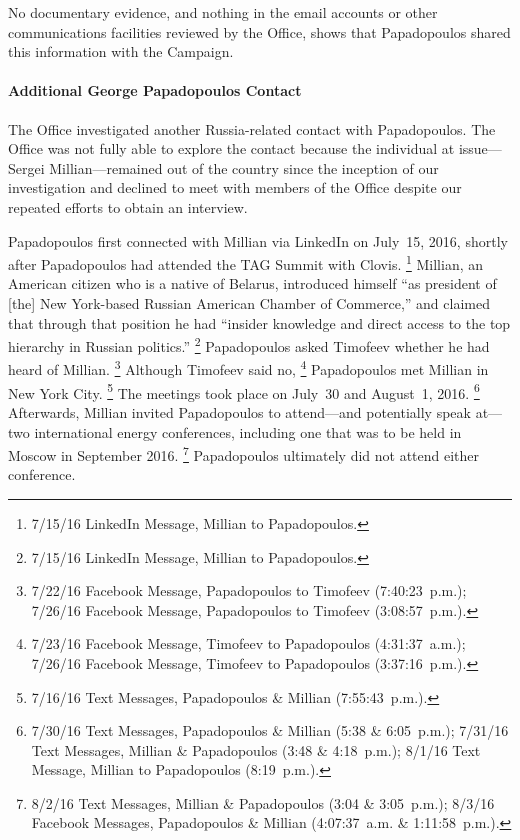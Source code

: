 No documentary evidence, and nothing in the email accounts or other communications facilities reviewed by the Office, shows that Papadopoulos shared this information with the Campaign.

\paragraph{Additional George Papadopoulos Contact}

The Office investigated another Russia-related contact with Papadopoulos.
The Office was not fully able to explore the contact because the individual at issue---Sergei Millian---remained out of the country since the inception of our investigation and declined to meet with members of the Office despite our repeated efforts to obtain an interview.

Papadopoulos first connected with Millian via LinkedIn on July~15, 2016, shortly after Papadopoulos had attended the TAG Summit with Clovis.%
\footnote{7/15/16 LinkedIn Message, Millian to Papadopoulos.}
Millian, an American citizen who is a native of Belarus, introduced himself ``as president of [the] New York-based Russian American Chamber of Commerce,'' and claimed that through that position he had ``insider knowledge and direct access to the top hierarchy in Russian politics.''%
\footnote{7/15/16 LinkedIn Message, Millian to Papadopoulos.}
Papadopoulos asked Timofeev whether he had heard of Millian.%
\footnote{7/22/16 Facebook Message, Papadopoulos to Timofeev (7:40:23~p.m.);
7/26/16 Facebook Message, Papadopoulos to Timofeev (3:08:57~p.m.).}
Although Timofeev said no,%
\footnote{7/23/16 Facebook Message, Timofeev to Papadopoulos (4:31:37~a.m.);
7/26/16 Facebook Message, Timofeev to Papadopoulos (3:37:16~p.m.).}
Papadopoulos met Millian in New York City.%
\footnote{7/16/16 Text Messages, Papadopoulos \& Millian (7:55:43~p.m.).}
The meetings took place on July~30 and August~1, 2016.%
\footnote{7/30/16 Text Messages, Papadopoulos \& Millian (5:38 \& 6:05~p.m.);
7/31/16 Text Messages, Millian \& Papadopoulos (3:48 \& 4:18~p.m.);
8/1/16 Text Message, Millian to Papadopoulos (8:19~p.m.).}
Afterwards, Millian invited Papadopoulos to attend---and potentially speak at---two international energy conferences, including one that was to be held in Moscow in September 2016.%
\footnote{8/2/16 Text Messages, Millian \& Papadopoulos (3:04 \& 3:05~p.m.);
8/3/16 Facebook Messages, Papadopoulos \& Millian (4:07:37~a.m. \& 1:11:58~p.m.).}
Papadopoulos ultimately did not attend either conference.

